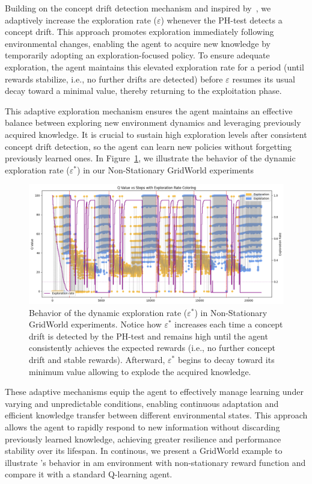 Building on the concept drift detection mechanism and inspired by~\citet{mignon2017adaptive}, we adaptively increase the exploration rate ($\varepsilon$) whenever the PH-test detects a concept drift. This approach promotes exploration immediately following environmental changes, enabling the agent to acquire new knowledge by temporarily adopting an exploration-focused policy. To ensure adequate exploration, the agent maintains this elevated exploration rate for a period (until rewards stabilize, i.e., no further drifts are detected) before $\varepsilon$ resumes its usual decay toward a minimal value, thereby returning to the exploitation phase.

This adaptive exploration mechanism ensures the agent maintains an effective balance between exploring new environment dynamics and leveraging previously acquired knowledge. It is crucial to sustain high exploration levels after consistent concept drift detection, so the agent can learn new policies without forgetting previously learned ones. In Figure~\ref{fig:dynamic-eps}, we illustrate the behavior of the dynamic exploration rate ($\varepsilon^*$) in our Non-Stationary GridWorld experiments

\begin{figure}
    \centering
    \includegraphics[width=\textwidth]{figures/epsilon.png}
    \caption{Behavior of the dynamic exploration rate ($\varepsilon^*$) in Non-Stationary GridWorld experiments. Notice how $\varepsilon^*$ increases each time a concept drift is detected by the PH-test and remains high until the agent consistently achieves the expected rewards (i.e., no further concept drift and stable rewards). Afterward, $\varepsilon^*$ begins to decay toward its minimum value allowing to explode the acquired knowledge.}
    \label{fig:dynamic-eps}
\end{figure}

These adaptive mechanisms equip the agent to effectively manage learning under varying and unpredictable conditions, enabling continuous adaptation and efficient knowledge transfer between different environmental states. This approach allows the agent to rapidly respond to new information without discarding previously learned knowledge, achieving greater resilience and performance stability over its lifespan. In continous, we present a GridWorld example to illustrate \adaptiverl's behavior in am environment with non-stationary reward function and compare it with a standard Q-learning agent.

